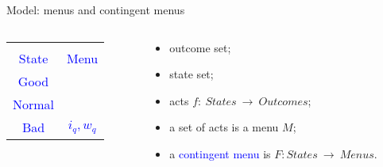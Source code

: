 \documentclass[usenames,dvipsnames,aspectratio=169,11pt, envcountsect, handout]{beamer}
\begin{document}
\begin{frame}[noframenumbering]{Model: menus and contingent menus}
	\vfill

	\begin{columns}
		\begin{column}{0.45\textwidth}  %
			\begin{center}

				\begin{table}[H]
					\centering
					\begin{tabular}{c | c}
						\multicolumn{2}{c}{}                                                         \\
						\textcolor{blue}{State}  & \textcolor{blue}{Menu}                            \\
						\hline
						\textcolor{blue}{Good}   & \textcolor{blue}{\multirow{2}{*}{\( i_p, w_p \)}} \\
						\textcolor{blue}{Normal} & \textcolor{blue}{}                                \\
						\hline
						\textcolor{blue}{Bad}    & \textcolor{blue}{\( i_q, w_q \)}                  \\
					\end{tabular}
				\end{table}
			\end{center}
		\end{column}

		\begin{column}{0.55\textwidth}  %
			\begin{itemize}
				\item outcome set;
				\item state set;
				\item acts \( f : \: States \: \rightarrow \: Outcomes \);
				\item a set of acts is a menu \( M \);
				\item a \textcolor{blue}{contingent menu} is \(F: States \: \rightarrow \: Menus \).
			\end{itemize}
		\end{column}
	\end{columns}

\end{frame}
\end{document}
